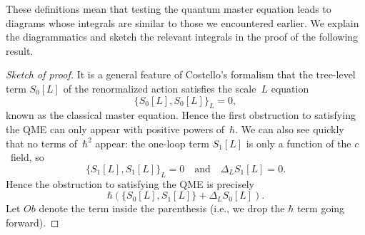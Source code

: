 These definitions mean that testing the quantum master equation leads to diagrams whose integrals are similar to those we encountered earlier.
We explain the diagrammatics and sketch the relevant integrals in the proof of the following result.

\begin{prop}
\end{prop}

\begin{proof}[Sketch of proof]
It is a general feature of Costello's formalism that the tree-level term $S_0[L]$ of the renormalized action satisfies the scale~$L$ equation
\[
\{S_0[L],S_0[L]\}_L = 0,
\]
known as the classical master equation.
Hence the first obstruction to satisfying the QME can only appear with positive powers of~$\hbar$.
We can also see quickly that no terms of~$\hbar^2$ appear:
the one-loop term $S_1[L]$ is only a function of the $c$~field, 
so 
\[
\{S_1[L],S_1[L]\}_L = 0 \quad\text{and}\quad \Delta_L S_1[L] = 0.
\]
Hence the obstruction to satisfying the QME is precisely
\[
\hbar\left( \{S_0[L],S_1[L]\} + \Delta_L S_0[L] \right).
\]
Let $Ob$ denote the term inside the parenthesis (i.e., we drop the $\hbar$ term going forward).
\end{proof}
